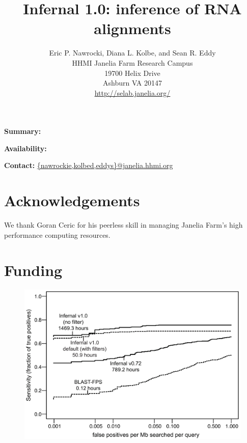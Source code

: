\documentclass[11pt]{article}
\begin{document}
\title{Infernal 1.0: inference of RNA alignments}
\author{Eric P. Nawrocki, Diana L. Kolbe, and Sean R. Eddy\\
HHMI Janelia Farm Research Campus\\
19700 Helix Drive\\
Ashburn VA 20147\\
\url{http://selab.janelia.org/}\\
}
\maketitle

\textbf{Summary:}

\textbf{Availability:}

\textbf{Contact:} \url{\{nawrockie,kolbed,eddys\}@janelia.hhmi.org}






\section{Acknowledgements}
We thank Goran Ceric for his peerless skill in managing Janelia Farm's
high performance computing resources.

\section{Funding}


\begin{figure}
\begin{center}
\includegraphics[width=6.4in]{figs/roc}

\label{Fig:roc}
\end{center}
\end{figure}

\begin{table}
\begin{center}

\end{center}

\label{Tab:timings}
\end{table}


\end{document}
